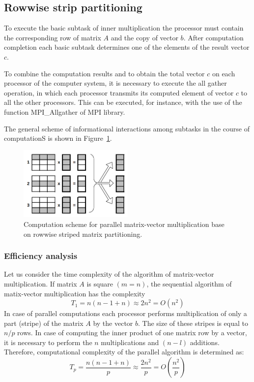 \subsection{Rowwise strip partitioning} %
\label{sub:matrix_vector_multiplication_in_case_of_rowwise_data_decomposition}
To execute the basic subtask of inner multiplication the processor must contain the corresponding row of matrix $A$ and the copy of vector $b$. After computation completion each basic subtask determines one of the elements of the result vector $c$.

To combine the computation results and to obtain the total vector $c$ on each processor of the computer system, it is necessary to execute the all gather operation, in which each processor transmits its computed element of vector $c$ to all the other processors. This can be executed, for instance, with the use of the function MPI\_Allgather of MPI library.

The general scheme of informational interactions among subtasks in the course of computationS is shown in Figure~\ref{fig:rowwise-scheme}.

\begin{figure}[htbp]
  \centering
  \includegraphics[width=0.5\textwidth]{illustrations/matrix-vector-product/rowwise.png}
  \caption{Computation scheme for parallel matrix-vector multiplication base on rowwise striped matrix partitioning.}
  \label{fig:rowwise-scheme}
\end{figure}


\subsubsection{Efficiency analysis} %
\label{ssub:efficienct_analysis}
Let us consider the time complexity of the algorithm of matrix-vector multiplication. If matrix $A$ is square $(m=n)$, the sequential algorithm of matix-vector multiplication has the complexity
\begin{equation}
  T_1 = n(n-1+n)\approx 2n^2 = O(n^2)
\end{equation}
In case of parallel computations each processor performs multiplication of only a part (stripe) of the matrix $A$ by the vector $b$. The size of these stripes is equal to $n/p$ rows. In case of computing the inner product of one matrix row by a vector, it is necessary to perform the $n$ multiplications and $(n-l)$ additions. Therefore, computational complexity of the parallel algorithm is determined as:
\begin{equation}
  T_p = \frac{n(n-1+n)}{p} \approx \frac{2n^2}{p} = O(\frac{n^2}{p})
\end{equation}

